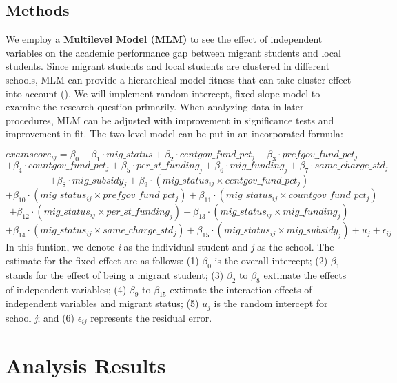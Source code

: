 \documentclass[
  man,
  floatsintext,
  longtable,
  nolmodern,
  notxfonts,
  notimes,
  colorlinks=true,linkcolor=blue,citecolor=blue,urlcolor=blue]{apa7}
\begin{document}
\subsection{Methods}\label{methods}

We employ a \textbf{Multilevel Model (MLM)} to see the effect of
independent variables on the academic performance gap between migrant
students and local students. Since migrant students and local students
are clustered in different schools, MLM can provide a hierarchical model
fitness that can take cluster effect into account
(). We will implement random intercept, fixed slope model to examine
the research question primarily. When analyzing data in later
procedures, MLM can be adjusted with improvement in significance tests
and improvement in fit. The two-level model can be put in an
incorporated formula:

\[ examscore_{ij}= \beta_0 + \beta_1 \cdot mig\_status + \beta_2 \cdot centgov\_fund\_pct_j + \beta_3 \cdot prefgov\_fund\_pct_j \]
\[+\beta_4 \cdot countgov\_fund\_pct_j + \beta_5 \cdot per\_st\_funding_j + \beta_6 \cdot mig\_funding_j + \beta_7 \cdot same\_charge\_std_j\]
\[ + \beta_8 \cdot mig\_subsidy_j  + \beta_9 \cdot (mig\_status_{ij} \times centgov\_fund\_pct_j) \]
\[ + \beta_{10} \cdot (mig\_status_{ij} \times prefgov\_fund\_pct_j) + \beta_{11} \cdot (mig\_status_{ij} \times countgov\_fund\_pct_j) \]
\[ + \beta_{12} \cdot (mig\_status_{ij} \times per\_st\_funding_j)  + \beta_{13} \cdot (mig\_status_{ij} \times mig\_funding_j) \]
\[ + \beta_{14} \cdot (mig\_status_{ij} \times same\_charge\_std_j)  + \beta_{15} \cdot (mig\_status_{ij} \times mig\_subsidy_j) + u_j + \epsilon_{ij} \]
In this funtion, we denote \emph{i} as the individual student and
\emph{j} as the school. The estimate for the fixed effect are as
follows: (1) \(\beta_0\) is the overall intercept; (2) \(\beta_1\)
stands for the effect of being a migrant student; (3) \(\beta_2\) to
\(\beta_8\) extimate the effects of independent variables; (4)
\(\beta_9\) to \(\beta_15\) extimate the interaction effects of
independent variables and migrant status; (5) \(u_j\) is the random
intercept for school \emph{j}; and (6) \(\epsilon_{ij}\) represents the
residual error.

\section{Analysis Results}\label{analysis-results}
\end{document}
